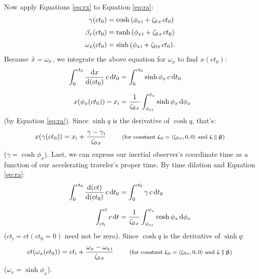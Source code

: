 \documentclass[12pt]{article}
\renewcommand{\mathring}[1]{\accentset{\circ}{#1}}
\newcommand{\dd}[1]{\mathrm{d}#1}
\newcommand{\vvbeta}{\bm{\upbeta}}
\newcommand{\vvzeta}{\bm{\upzeta}}
\begin{document}
Now apply Equations \ref{eq:rx} to Equation \ref{eq:ra}:
\begin{equation*}
\begin{aligned}
\gamma (ct_0) &= \cosh{\left( \phi_{x \mkern2mu \textrm{i} } + \zeta_{0 \mkern2mu x} \mkern2mu ct_0 \right)} \\[3pt]
\beta_x (ct_0) &= \tanh{\left( \phi_{x \mkern2mu \textrm{i} } + \zeta_{0 \mkern2mu x} \mkern2mu ct_0 \right)} \\[3pt]
\omega_x (ct_0) &= \sinh{\left( \phi_{x \mkern2mu \textrm{i} } + \zeta_{0 \mkern2mu x} \mkern2mu ct_0 \right)} .
\end{aligned}
\end{equation*}
Because $\mathring{x} = \omega_x$, we integrate the above equation for $\omega_x$ to find $x(ct_0)$:
\begin{equation*}
\begin{split}
\int^{ct_0}_0 \dfrac{\dd x}{\dd (c t_0)} \, c \, \dd t_0 &= \int^{ct_0}_0 \sinh{\phi_x} \, c \, \dd t_0 \\[6pt]
x(\phi_x(ct_0)) - x_{\mathrm{i}} &= \dfrac{1}{\zeta_{0 \mkern2mu x}} \int^{\phi_x}_{\phi_{x \mkern1mu \textrm{i} }} \sinh{\phi_x} \, \dd \phi_x
\end{split}
\end{equation*}
(by Equation \ref{eq:ra}). Since $\sinh{q}$ is the derivative of $\cosh{q}$, that's:
\begin{equation}\label{eq:x2}
x(\gamma(ct_0)) = x_{\mathrm{i}} + \dfrac{\gamma - \gamma_{\mkern1mu \mathrm{i}}}{ \zeta_{0 \mkern2mu x}} \qquad \textrm{\footnotesize{ (for constant $\vvzeta_{\mkern1mu 0} = \langle \zeta_{0 \mkern1mu x} , 0, 0 \rangle$ and $\vvzeta \parallel \vvbeta$)}}
\end{equation}
($\gamma = \cosh{\phi_x}$). Last, we can express our inertial observer's coordinate time as a function of our accelerating traveler's proper time. By time dilation and Equation \ref{eq:ra}:
\begin{equation*}
\begin{split}
\int^{ct_0}_0 \dfrac{\dd (ct)}{\dd (c t_0)} \, c \, \dd t_0 &= \int^{ct_0}_0 \gamma \, c \, \dd t_0 \\[6pt]
\int^{ct}_{ct_{\mathrm{i}}} c \, \dd t &= \dfrac{1}{ \zeta_{0 \mkern2mu x}} \int^{\phi_x}_{\phi_{x \mkern1mu \textrm{i} }} \cosh{\phi_x} \, \dd \phi_x
\end{split}
\end{equation*}
($ct_{\mathrm{i}} = ct (ct_0 = 0)$ need not be zero). Since $\cosh q$ is the derivative of $\sinh q$:
\begin{equation}\label{eq:ct}
ct(\omega_x(ct_0)) = ct_{\mathrm{i}} + \dfrac{\omega_x - \omega_{x \mkern2mu \textrm{i} }}{ \zeta_{0 \mkern2mu x}} \qquad \textrm{\footnotesize{ (for constant $\vvzeta_{\mkern1mu 0} = \langle \zeta_{0 \mkern1mu x} , 0, 0 \rangle$ and $\vvzeta \parallel \vvbeta$)}}
\end{equation}
($\omega_x = \sinh{\phi_x}$).
\end{document}
